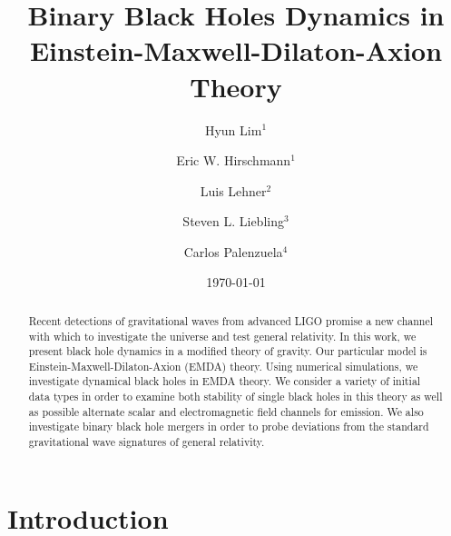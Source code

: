 \documentclass[%
 reprint,
 amsmath,amssymb,
 aps,
]{revtex4-1}
\begin{document}

\title{Binary Black Holes Dynamics in Einstein-Maxwell-Dilaton-Axion Theory}%

\author{Hyun Lim$^1$}
\author{Eric W. Hirschmann$^1$}%
\author{Luis Lehner$^2$}
\author{Steven L. Liebling$^3$}
\author{Carlos Palenzuela$^4$}
%

\date{\today}%

\begin{abstract}
Recent detections of gravitational waves from advanced LIGO promise a new channel with which to investigate the universe and test general relativity. In this work, we present black hole dynamics in a modified theory of gravity. Our particular model is Einstein-Maxwell-Dilaton-Axion (EMDA) theory. Using numerical simulations, we investigate dynamical black holes in EMDA theory. We consider a variety of initial data types in order to examine both stability of single black holes in this theory as well as possible alternate scalar and electromagnetic field channels for emission. We also investigate binary black hole mergers in order to probe deviations from the standard gravitational wave signatures of general relativity.
\end{abstract}

\maketitle


\section{Introduction}
\end{document}
